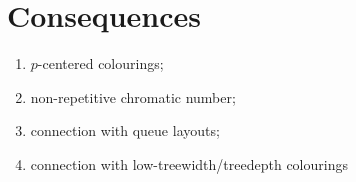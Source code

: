\documentclass{patmorin}
\begin{document}
\section{Consequences}

\begin{enumerate}
  \item $p$-centered colourings;
  \item non-repetitive chromatic number;
  \item connection with queue layouts;
  \item connection with low-treewidth/treedepth colourings
\end{enumerate}




\end{document}
